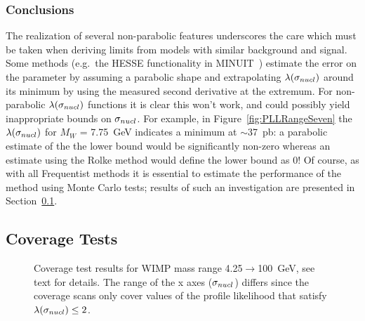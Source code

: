 		\subsubsection{Conclusions}
		\label{sec:LLPathoConclusions}

The realization of several non-parabolic features underscores the care which must be taken when deriving limits from models with similar background and signal.  Some methods (e.g.~the HESSE functionality in MINUIT~\cite{James:1975dr}) estimate the error on the parameter by assuming a parabolic shape and extrapolating $\lambda(\sigma_{nucl})$ around its minimum by using the measured second derivative at the extremum.  For non-parabolic $\lambda(\sigma_{nucl})$ functions it is clear this won't work, and could possibly yield inappropriate bounds on $\sigma_{nucl}$.  For example, in Figure~\ref{fig:PLLRangeSeven} the $\lambda(\sigma_{nucl})$ for $M_{W}$ = 7.75~GeV indicates a minimum at $\sim$37~pb: a parabolic estimate of the the lower bound would be significantly non-zero %
whereas an estimate using the Rolke method would define the lower bound as 0!  Of course, as with all Frequentist methods it is essential to estimate the performance of the method using Monte Carlo tests; results of such an investigation are presented in Section~\ref{sec:LimitsCoverageTests}.

	\subsection{Coverage Tests}
	\label{sec:LimitsCoverageTests}			

		\begin{sidewaysfigure}
			\centering
			\caption[Coverage test results for WIMP mass range 4.25$\to$100~GeV]
			{Coverage test results for WIMP mass range 4.25$\to$100~GeV, see text for details. The range of the x axes ($\sigma_{nucl}$) differs since the coverage scans only
			cover values of the profile likelihood that satisfy $\lambda(\sigma_{nucl}) \leq 2$.}
			\label{fig:CoverageTestResults}
		\end{sidewaysfigure}

